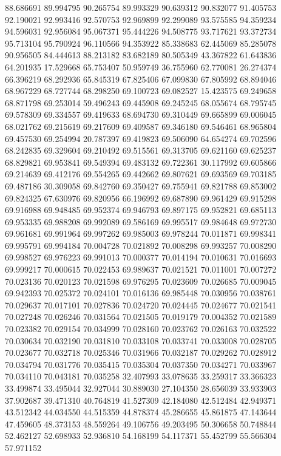 88.686691
89.994795
90.265754
89.993329
90.639312
90.832077
91.405753
92.190021
92.993416
92.570753
92.969899
92.299089
93.575585
94.359234
94.596031
92.956084
95.067371
95.444226
94.508775
93.717621
93.372734
95.713104
95.790924
96.110566
94.353922
85.338683
62.445069
85.285078
90.956505
84.444613
88.213182
83.682189
80.505349
43.367822
61.643836
64.201935
17.529668
65.753407
50.959749
36.755960
62.770081
26.274374
66.396219
68.292936
65.845319
67.825406
67.099830
67.805992
68.894046
68.967229
68.727744
68.298250
69.100723
69.082527
15.423575
69.249658
68.871798
69.253014
59.496243
69.445908
69.245245
68.055674
68.795745
69.578309
69.334557
69.419633
68.694730
69.310449
69.665899
69.006045
68.021762
69.215619
69.217609
69.409587
69.346180
69.546461
68.965804
69.457530
69.254994
20.787397
69.419823
69.506090
64.654274
69.702596
68.242835
69.329604
69.210492
69.515561
69.313705
69.621160
69.625237
68.829821
69.953841
69.549394
69.483132
69.722361
30.117992
69.605866
69.214639
69.412176
69.554265
69.442662
69.807621
69.693569
69.703185
69.487186
30.309058
69.842760
69.350427
69.755941
69.821788
69.853002
69.824325
67.630976
69.820956
66.196992
69.687890
69.961429
69.915298
69.916988
69.948485
69.952374
69.946793
69.897175
69.952821
69.685113
69.953335
69.988208
69.992089
69.586169
69.995517
69.984648
69.972730
69.961681
69.991964
69.997262
69.985003
69.978244
70.011871
69.998341
69.995791
69.994184
70.004728
70.021892
70.008298
69.993257
70.008290
69.998527
69.976223
69.991013
70.000377
70.014194
70.010631
70.016693
69.999217
70.000615
70.022453
69.989637
70.021521
70.011001
70.007272
70.023136
70.020123
70.021598
69.976295
70.023609
70.026685
70.009045
69.942393
70.025372
70.024101
70.016136
69.985448
70.030956
70.038761
70.029637
70.017101
70.027836
70.024720
70.024445
70.024677
70.021541
70.027248
70.026246
70.031564
70.021505
70.019179
70.004352
70.021589
70.023382
70.029154
70.034999
70.028160
70.023762
70.026163
70.032522
70.030634
70.032190
70.031810
70.033108
70.033741
70.033008
70.028705
70.023677
70.032718
70.025346
70.031966
70.032187
70.029262
70.028912
70.034794
70.031776
70.035415
70.035304
70.037350
70.034271
70.033967
70.034110
70.043181
70.035258
32.407993
33.078635
33.259317
33.366323
33.499874
33.495044
32.927044
30.889030
27.104350
28.656039
33.933903
37.902687
39.471310
40.764819
41.527309
42.184080
42.512484
42.949371
43.512342
44.034550
44.515359
44.878374
45.286655
45.861875
47.143644
47.459605
48.373153
48.559264
49.106756
49.203495
50.306658
50.748844
52.462127
52.698933
52.936810
54.168199
54.117371
55.452799
55.566304
57.971152
